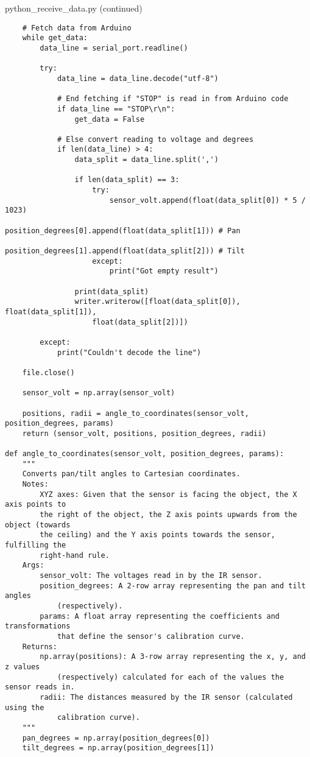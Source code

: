 \documentclass{article}
\begin{document}
\begin{tcolorbox}
python\_receive\_data.py (continued)
\begin{verbatim}
    # Fetch data from Arduino
    while get_data:
        data_line = serial_port.readline()

        try:
            data_line = data_line.decode("utf-8")

            # End fetching if "STOP" is read in from Arduino code
            if data_line == "STOP\r\n":
                get_data = False

            # Else convert reading to voltage and degrees
            if len(data_line) > 4:
                data_split = data_line.split(',')

                if len(data_split) == 3:
                    try:
                        sensor_volt.append(float(data_split[0]) * 5 / 1023)
                        position_degrees[0].append(float(data_split[1])) # Pan
                        position_degrees[1].append(float(data_split[2])) # Tilt
                    except:
                        print("Got empty result")

                print(data_split)
                writer.writerow([float(data_split[0]), float(data_split[1]),
                    float(data_split[2])])

        except:
            print("Couldn't decode the line")

    file.close()

    sensor_volt = np.array(sensor_volt)

    positions, radii = angle_to_coordinates(sensor_volt, position_degrees, params)
    return (sensor_volt, positions, position_degrees, radii)

def angle_to_coordinates(sensor_volt, position_degrees, params):
    """
    Converts pan/tilt angles to Cartesian coordinates.
    Notes:
        XYZ axes: Given that the sensor is facing the object, the X axis points to
        the right of the object, the Z axis points upwards from the object (towards
        the ceiling) and the Y axis points towards the sensor, fulfilling the
        right-hand rule.
    Args:
        sensor_volt: The voltages read in by the IR sensor.
        position_degrees: A 2-row array representing the pan and tilt angles
            (respectively).
        params: A float array representing the coefficients and transformations
            that define the sensor's calibration curve.
    Returns:
        np.array(positions): A 3-row array representing the x, y, and z values
            (respectively) calculated for each of the values the sensor reads in.
        radii: The distances measured by the IR sensor (calculated using the
            calibration curve).
    """
    pan_degrees = np.array(position_degrees[0])
    tilt_degrees = np.array(position_degrees[1])


\end{verbatim}
\end{tcolorbox}
\end{document}
